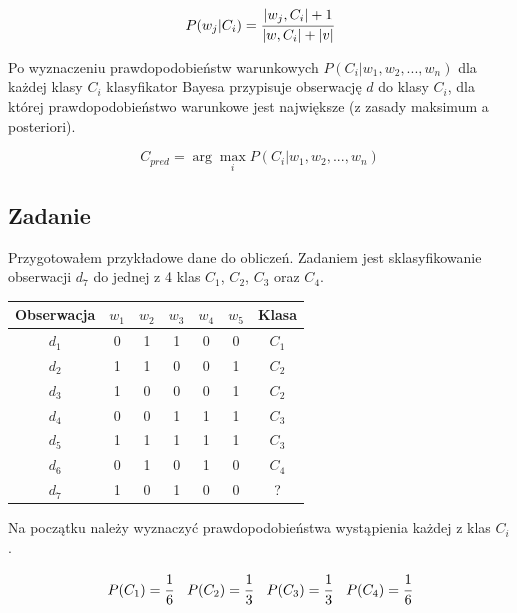 \documentclass{article}
\begin{document}
\begin{equation}\label{eq:eq1}
    P(w_j|C_i) = \cfrac{|w_j, C_i| + 1}{|w, C_i| + |v|}
\end{equation}

Po wyznaczeniu prawdopodobieństw warunkowych $P(C_i|w_1, w_2, ..., w_n)$ dla każdej klasy
$C_i$ klasyfikator Bayesa przypisuje obserwację $d$ do klasy $C_i$, dla której prawdopodobieństwo
warunkowe jest największe (z zasady maksimum a posteriori).

\begin{equation}
    C_{pred} = \arg\max_{i}P(C_i|w_1, w_2, ..., w_n)
\end{equation}

\subsection{Zadanie}

Przygotowałem przykładowe dane do obliczeń. Zadaniem jest
sklasyfikowanie obserwacji $d_7$ do jednej z 4 klas $C_1$, $C_2$, $C_3$ oraz $C_4$.

\begin{table}[H]
    \centering
    \begin{tabular}{|c|c|c|c|c|c|c|}
        \hline
        Obserwacja & $w_1$ & $w_2$ & $w_3$ & $w_4$ & $w_5$ & Klasa \\
        \hline
        $d_1$ & 0 & 1 & 1 & 0 & 0 & $C_1$ \\
        \hline
        $d_2$ & 1 & 1 & 0 & 0 & 1 & $C_2$ \\
        \hline
        $d_3$ & 1 & 0 & 0 & 0 & 1 & $C_2$ \\
        \hline
        $d_4$ & 0 & 0 & 1 & 1 & 1 & $C_3$ \\
        \hline
        $d_5$ & 1 & 1 & 1 & 1 & 1 & $C_3$ \\
        \hline
        $d_6$ & 0 & 1 & 0 & 1 & 0 & $C_4$ \\
        \hline
        $d_7$ & 1 & 0 & 1 & 0 & 0 & ? \\
        \hline
    \end{tabular}
\end{table}

Na początku należy wyznaczyć prawdopodobieństwa wystąpienia każdej z klas $C_i$.

\begin{equation}
    P(C_1) = \cfrac{1}{6} \quad P(C_2) = \cfrac{1}{3} \quad P(C_3) = \cfrac{1}{3} \quad P(C_4) = \cfrac{1}{6}
\end{equation}
\end{document}
